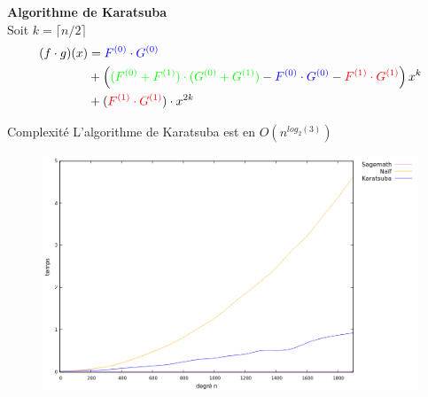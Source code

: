 \documentclass[10pt,a4paper]{beamer}
\begin{document}
\begin{frame}
    \textbf{Algorithme de Karatsuba} \\
    Soit $k= \lceil n/2 \rceil$
    \begin{align*}
        (f \cdot g)(x) &= \textcolor{blue}{F^{(0)} \cdot G^{(0)}}\\
            &+\left( \textcolor{green}{(F^{(0)}+F^{(1)}) \cdot (G^{(0)} + G^{(1)})} - \textcolor{blue}{F^{(0)} \cdot G^{(0)}} - \textcolor{red}{F^{(1)} \cdot G^{(1)}} \right)x^k\\
            &+ (\textcolor{red}{F^{(1)} \cdot G^{(1)}}) \cdot x^{2k} 
    \end{align*}

    \begin{alertblock}{Complexité}
        L'algorithme de Karatsuba est en $O(n^{log_2(3)})$
    \end{alertblock}

\end{frame}

\begin{frame}
    \begin{figure}
    \includegraphics[scale=0.45, center]{multi.png}
    \end{figure}
\end{frame}

\end{document}
